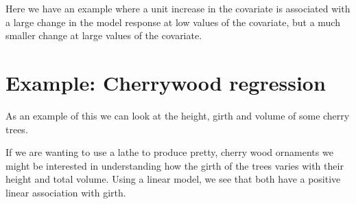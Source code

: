 \documentclass[
  12pt,
]{book}
\begin{document}
Here we have an example where a unit increase in the covariate is associated with a large change in the model response at low values of the covariate, but a much smaller change at large values of the covariate.

\hypertarget{example-cherrywood-regression}{%
\section{Example: Cherrywood regression}\label{example-cherrywood-regression}}

As an example of this we can look at the height, girth and volume of some cherry trees.

If we are wanting to use a lathe to produce pretty, cherry wood ornaments we might be interested in understanding how the girth of the trees varies with their height and total volume. Using a linear model, we see that both have a positive linear association with girth.
\end{document}
